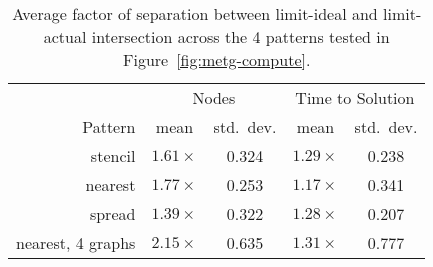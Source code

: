 \begin{table}[t]
\color{blue}
\centering
\small
\begin{tabular}{r | c | c | c | c}
        & \multicolumn{2}{|c|}{Nodes} & \multicolumn{2}{|c}{Time to Solution} \\
Pattern & mean & std.~dev. & mean & std.~dev. \\
\hline
stencil & $1.61\times$ & 0.324 & $1.29\times$ & 0.238 \\
nearest & $1.77\times$ & 0.253 & $1.17\times$ & 0.341 \\
spread  & $1.39\times$ & 0.322 & $1.28\times$ & 0.207 \\
nearest, 4 graphs & $2.15\times$ & 0.635 & $1.31\times$ & 0.777
\end{tabular}

\vspace{-0.20cm}
\caption{\color{blue} Average factor of separation between limit-ideal and limit-actual intersection across the 4 patterns tested in Figure~\ref{fig:metg-compute}.\label{tab:metg-predict-strong}}
\vspace{-0.5cm}
\end{table}
